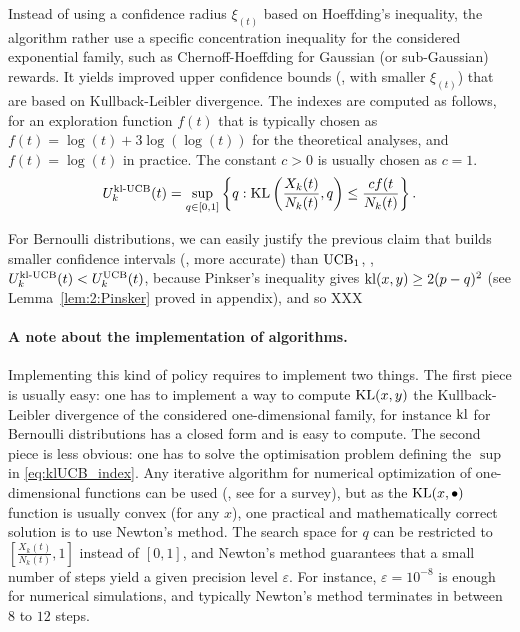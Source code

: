 Instead of using a confidence radius $\xi_(t)$ based on Hoeffding's inequality,
the \klUCB{} algorithm rather use a specific concentration inequality for the considered exponential family, such as Chernoff-Hoeffding for Gaussian (or sub-Gaussian) rewards.
It yields improved upper confidence bounds (\ie, with smaller $\xi_(t)$) that are based on Kullback-Leibler divergence.
The indexes are computed as follows, for an exploration function $f(t)$
that is typically chosen as $f(t)=\log(t)+3\log(\log(t))$ for the theoretical analyses,
and $f(t)=\log(t)$ in practice.
The constant $c>0$ is usually chosen as $c=1$.
\begin{align}\label{eq:klUCB_index}
    U_k^{\mathrm{kl}\text{-}\mathrm{UCB}}(t) = \sup\limits_{q \in [0, 1]} \left\{ q : \mathrm{KL}\left(\frac{X_k(t)}{N_k(t)}, q\right) \leq \frac{c f(t}{N_k(t)} \right\}.
\end{align}

For Bernoulli distributions,
we can easily justify the previous claim that \klUCB{} builds smaller confidence intervals (\ie, more accurate) than $\mathrm{UCB}_1$,
\ie, $U_k^{\mathrm{kl}\text{-}\mathrm{UCB}}(t) < U_k^{\mathrm{UCB}}(t)$,
because Pinkser's inequality gives $\mathrm{kl}(x,y) \geq 2(p-q)^2$ (see Lemma~\ref{lem:2:Pinsker} proved in appendix),
and so XXX


\paragraph{A note about the implementation of \klUCB{} algorithms.}
%
Implementing this kind of policy requires to implement two things.
The first piece is usually easy: one has to implement a way to compute $\mathrm{KL}(x,y)$ the Kullback-Leibler divergence of the considered one-dimensional family,
for instance $\mathrm{kl}$ for Bernoulli distributions has a closed form and is easy to compute.
The second piece is less obvious: one has to solve the optimisation problem defining the $\sup$ in \eqref{eq:klUCB_index}.
Any iterative algorithm for numerical optimization of one-dimensional functions can be used (\eg, see \cite{BoydVanderberghe04} for a survey), but as the $\mathrm{KL}(x,\bullet)$ function is usually convex (for any $x$), one practical and mathematically correct solution is to use Newton's method.
The search space for $q$ can be restricted to $[\frac{X_k(t)}{N_k(t)}, 1]$ instead of $[0,1]$, and Newton's method guarantees that a small number of steps yield a given precision level $\varepsilon$.
For instance, $\varepsilon=10^{-8}$ is enough for numerical simulations, and typically Newton's method terminates in between $8$ to $12$ steps.

